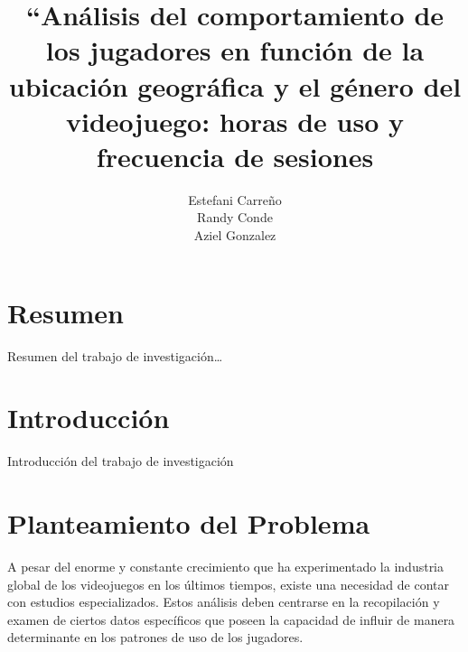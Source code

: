 \documentclass[oneside,11pt]{Latex/Classes/PhDthesisPSnPDF}
\title{``Análisis del comportamiento de los jugadores en función de la
ubicación geográfica y el género del videojuego: horas de uso y
frecuencia de sesiones}
\author{Estefani Carreño \\ Randy Conde \\ Aziel Gonzalez}
\begin{document}
\maketitle

\frontmatter


\setcounter{secnumdepth}{3}
\setcounter{tocdepth}{3}

\tableofcontents



\cleardoublepage

  \cleardoublepage       %
  \chapter*{Resumen}     %
  
  Resumen del trabajo de
investigación\ldots{}             %
  
  \cleardoublepage

\mainmatter
\def\baselinestretch{1.5}

\chapter*{Introducción}

Introducción del trabajo de investigación

\chapter{Planteamiento del Problema}

A pesar del enorme y constante crecimiento que ha experimentado la
industria global de los videojuegos en los últimos tiempos, existe una
necesidad de contar con estudios especializados. Estos análisis deben
centrarse en la recopilación y examen de ciertos datos específicos que
poseen la capacidad de influir de manera determinante en los patrones de
uso de los jugadores.
\end{document}
